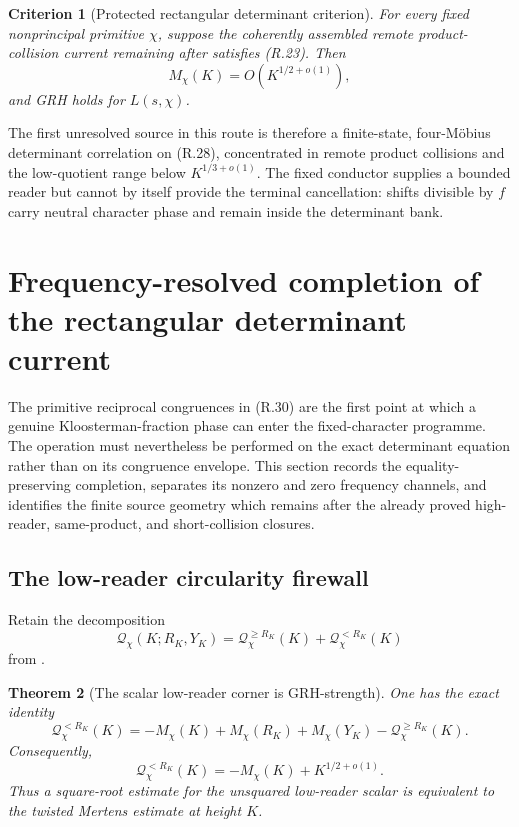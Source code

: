 \documentclass[11pt]{article}
\newtheorem{theorem}{Theorem}[section]
\newtheorem{criterion}[theorem]{Criterion}
\theoremstyle{definition}
\theoremstyle{remark}
\begin{document}
\begin{criterion}[Protected rectangular determinant criterion]
\label{crit:rectangular-determinant}
For every fixed nonprincipal primitive $\chi$, suppose the coherently
assembled remote product-collision current remaining after
satisfies \textup{(R.23)}.  Then
\[
 M_\chi(K)=O(K^{1/2+o(1)}),
\]
and GRH holds for $L(s,\chi)$.
\end{criterion}

The first unresolved source in this route is therefore a finite-state,
four-M\"obius determinant correlation on \textup{(R.28)}, concentrated in
remote product collisions and the low-quotient range below $K^{1/3+o(1)}$.
The fixed conductor supplies a bounded reader but cannot by itself provide
the terminal cancellation: shifts divisible by $f$ carry neutral character
phase and remain inside the determinant bank.


\section{Frequency-resolved completion of the rectangular determinant current}
\label{sec:grh-frequency-resolved}

The primitive reciprocal congruences in \textup{(R.30)} are the first point
at which a genuine Kloosterman-fraction phase can enter the fixed-character
programme.  The operation must nevertheless be performed on the exact
determinant equation rather than on its congruence envelope.  This section
records the equality-preserving completion, separates its nonzero and zero
frequency channels, and identifies the finite source geometry which remains
after the already proved high-reader, same-product, and short-collision
closures.

\subsection{The low-reader circularity firewall}

Retain the decomposition
\[
 \mathcal Q_\chi(K;R_K,Y_K)
 =\mathcal Q_\chi^{\ge R_K}(K)
  +\mathcal Q_\chi^{<R_K}(K)
\]
from .

\begin{theorem}[The scalar low-reader corner is GRH-strength]
\label{thm:freq-low-corner}
One has the exact identity
\[
 \boxed{
 \mathcal Q_\chi^{<R_K}(K)
 =-M_\chi(K)+M_\chi(R_K)+M_\chi(Y_K)
  -\mathcal Q_\chi^{\ge R_K}(K).}
 \tag{F.1}
\]
Consequently,
\[
 \boxed{
 \mathcal Q_\chi^{<R_K}(K)
 =-M_\chi(K)+K^{1/2+o(1)}.}
 \tag{F.2}
\]
Thus a square-root estimate for the unsquared low-reader scalar is equivalent
to the twisted Mertens estimate at height $K$.
\end{theorem}
\end{document}
